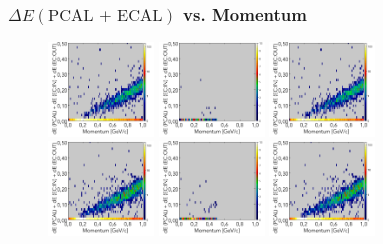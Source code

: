 \documentclass[xcolor=table, xcolor=dvipsnames]{beamer}
\begin{document}
      
      \begin{frame}
        \frametitle{$\Delta E(\text{PCAL + ECAL})$ vs. Momentum}
        \footnotesize
        \begin{figure}
          \includegraphics[width=0.25\textwidth,origin=l]{triggerStudies_Tor1_CAL.png}
          \includegraphics[width=0.25\textwidth]{triggerStudies_Tor1_cut05_CAL_IN.png}
          \includegraphics[width=0.25\textwidth,origin=r]{triggerStudies_Tor1_cut05_CAL_OUT.png}\\
            
          \includegraphics[width=0.25\textwidth,origin=l]{triggerStudies_Tor075_cut05_CAL.png}
          \includegraphics[width=0.25\textwidth]{triggerStudies_Tor075_cut05_CAL_IN.png}
           \includegraphics[width=0.25\textwidth,origin=r]{triggerStudies_Tor075_cut05_CAL_OUT.png}  
        \end{figure}
        

\end{frame}
\end{document}
